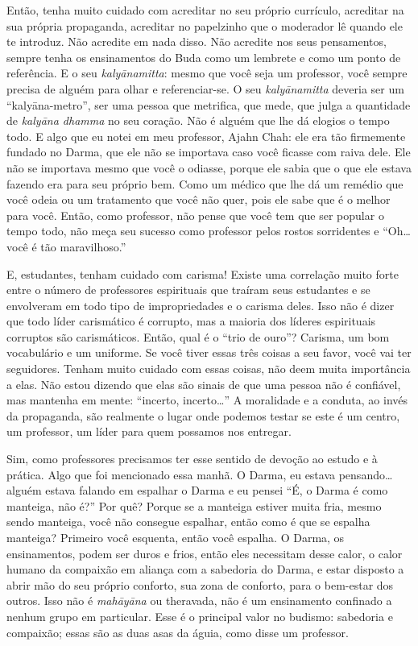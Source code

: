 Então, tenha muito cuidado com acreditar no seu próprio currículo,
acreditar na sua própria propaganda, acreditar no papelzinho que o
moderador lê quando ele te introduz. Não acredite em nada disso. Não
acredite nos seus pensamentos, sempre tenha os ensinamentos do Buda
como um lembrete e como um ponto de referência. E o seu
\textit{kalyānamitta}: mesmo que você seja um professor, você sempre
precisa de alguém para olhar e referenciar-se. O seu
\textit{kalyānamitta }deveria ser um “kalyāna-metro”, ser uma
pessoa que metrifica, que mede, que julga a quantidade de
\textit{kalyāna dhamma }no seu coração. Não é alguém que lhe dá
elogios o tempo todo. E algo que eu notei em meu professor, Ajahn Chah:
ele era tão firmemente fundado no Darma, que ele não se importava caso
você ficasse com raiva dele. Ele não se importava mesmo que você o
odiasse, porque ele sabia que o que ele estava fazendo era para seu
próprio bem. Como um médico que lhe dá um remédio que você odeia ou um
tratamento que você não quer, pois ele sabe que é o melhor para você.
Então, como professor, não pense que você tem que ser popular o tempo
todo, não meça seu sucesso como professor pelos rostos sorridentes e
“Oh… você é tão maravilhoso.” 

E, estudantes, tenham cuidado com carisma! Existe uma correlação
muito forte entre o número de professores espirituais que traíram seus
estudantes e se envolveram em todo tipo de impropriedades e o carisma
deles. Isso não é dizer que todo líder carismático é corrupto, mas a
maioria dos líderes espirituais corruptos são carismáticos. Então, qual
é o “trio de ouro”? Carisma, um bom vocabulário e um uniforme. Se você
tiver essas três coisas a seu favor, você vai ter seguidores. Tenham
muito cuidado com essas coisas, não deem muita importância a elas. Não
estou dizendo que elas são sinais de que uma pessoa não é confiável,
mas mantenha em mente: “incerto, incerto…” A moralidade e a conduta, ao
invés da propaganda, são realmente o lugar onde podemos testar se este
é um centro, um professor, um líder para quem possamos nos entregar. 

Sim, como professores precisamos ter esse sentido de devoção ao
estudo e à prática. Algo que foi mencionado essa manhã. O Darma, eu
estava pensando… alguém estava falando em espalhar o Darma e eu pensei
“É, o Darma é como manteiga, não é?” Por quê? Porque se a manteiga
estiver muita fria, mesmo sendo manteiga, você não consegue espalhar,
então como é que se espalha manteiga? Primeiro você esquenta, então
você espalha. O Darma, os ensinamentos, podem ser duros e frios, então
eles necessitam desse calor, o calor humano da compaixão em aliança com
a sabedoria do Darma, e estar disposto a abrir mão do seu próprio
conforto, sua zona de conforto, para o bem-estar dos outros. Isso não é
\textit{mahāyāna} ou theravada, não é um ensinamento confinado a
nenhum grupo em particular. Esse é o principal valor no budismo:
sabedoria e compaixão; essas são as duas asas da águia, como disse um
professor. 

